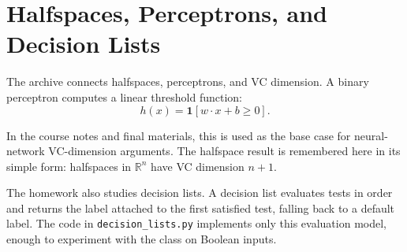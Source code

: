 \section{Halfspaces, Perceptrons, and Decision Lists}

The archive connects halfspaces, perceptrons, and VC dimension. A binary
perceptron computes a linear threshold function:
\[
  h(x)=\mathbf{1}[w \cdot x + b \geq 0].
\]

In the course notes and final materials, this is used as the base case for
neural-network VC-dimension arguments. The halfspace result is remembered here
in its simple form: halfspaces in $\mathbb{R}^n$ have VC dimension $n+1$.

The homework also studies decision lists. A decision list evaluates tests in
order and returns the label attached to the first satisfied test, falling back
to a default label. The code in \texttt{decision\_lists.py} implements only this
evaluation model, enough to experiment with the class on Boolean inputs.

